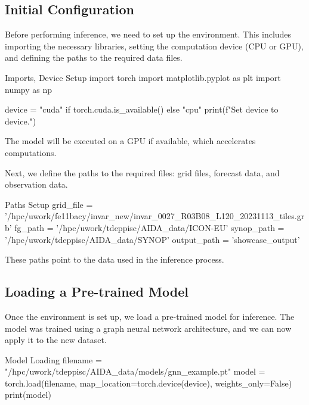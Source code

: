 %
\subsection{Initial Configuration}

Before performing inference, we need to set up the environment. This includes importing the necessary libraries, setting the computation device (CPU or GPU), and defining the paths to the required data files.

\begin{codeonly}{Imports, Device Setup}
import torch
import matplotlib.pyplot as plt
import numpy as np

device = "cuda" if torch.cuda.is_available() else "cpu"
print(f"Set device to {device}.")
\end{codeonly}

The model will be executed on a GPU if available, which accelerates computations.

Next, we define the paths to the required files: grid files, forecast data, and observation data.

\begin{codeonly}{Paths Setup}
grid_file = '/hpc/uwork/fe11bacy/invar_new/invar_0027_R03B08_L120_20231113_tiles.grb'
fg_path = '/hpc/uwork/tdeppisc/AIDA_data/ICON-EU'
synop_path = '/hpc/uwork/tdeppisc/AIDA_data/SYNOP'
output_path = 'showcase_output'
\end{codeonly}

These paths point to the data used in the inference process.

%
\subsection{Loading a Pre-trained Model}

Once the environment is set up, we load a pre-trained model for inference. The model was trained using a graph neural network architecture, and we can now apply it to the new dataset.

\begin{codeonly}{Model Loading}
filename = "/hpc/uwork/tdeppisc/AIDA_data/models/gnn_example.pt"
model = torch.load(filename, map_location=torch.device(device), weights_only=False)
print(model)
\end{codeonly}

